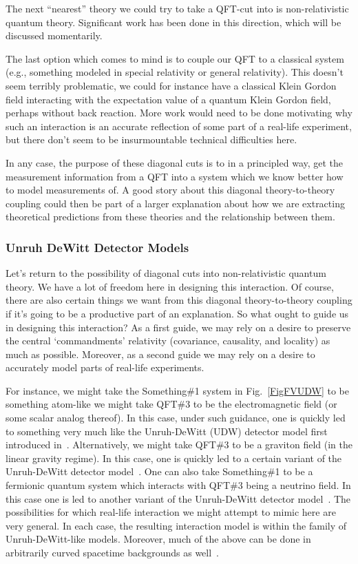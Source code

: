 \documentclass[12pt,prd,superscriptaddress,floatfix,amsmath,amssymb,amsfonts,nofootinbib]{revtex4-2}
\begin{document}
The next ``nearest'' theory we could try to take a QFT-cut into is non-relativistic quantum theory. Significant work has been done in this direction, which will be discussed momentarily.

The last option which comes to mind is to couple our QFT to a classical system (e.g., something modeled in special relativity or general relativity). This doesn't seem terribly problematic, we could for instance have a classical Klein Gordon field interacting with the expectation value of a quantum Klein Gordon field, perhaps without back reaction. More work would need to be done motivating why such an interaction is an accurate reflection of some part of a real-life experiment, but there don't seem to be insurmountable technical difficulties here.

In any case, the purpose of these diagonal cuts is to in a principled way, get the measurement information from a QFT into a system which we know better how to model measurements of. A good story about this diagonal theory-to-theory coupling could then be part of a larger explanation about how we are extracting theoretical predictions from these theories and the relationship between them. 

\subsubsection*{Unruh DeWitt Detector Models}
Let's return to the possibility of diagonal cuts into non-relativistic quantum theory. We have a lot of freedom here in designing this interaction. Of course, there are also certain things we want from this diagonal theory-to-theory coupling if it's going to be a productive part of an explanation. So what ought to guide us in designing this interaction? As a first guide, we may rely on a desire to preserve the central `commandments' relativity (covariance, causality, and locality) as much as possible. Moreover, as a second guide we may rely on a desire to accurately model parts of real-life experiments. 

For instance, we might take the Something\#1 system in Fig.~\ref{FigFVUDW} to be something atom-like we might take QFT\#3 to be the electromagnetic field (or some scalar analog thereof). In this case, under such guidance, one is quickly led~\cite{Pablo,RichardEdu,Richard} to something very much like the Unruh-DeWitt (UDW) detector model first introduced in~\cite{Unruh1976}.  Alternatively, we might take QFT\#3 to be a graviton field (in the linear gravity regime). In this case, one is quickly led to a certain variant of the Unruh-DeWitt detector model~\cite{GRQO,GravityDetector,GravityDetector2}. One can also take Something\#1 to be a fermionic quantum system which interacts with QFT\#3 being a neutrino field. In this case one is led to another variant of the Unruh-DeWitt detector model~\cite{MatsasNeutrinos, perche2021antiparticle}. The possibilities for which real-life interaction we might attempt to mimic here are very general. In each case, the resulting interaction model is within the family of Unruh-DeWitt-like models. Moreover, much of the above can be done in arbitrarily curved spacetime backgrounds as well~\cite{GRQO}.
\end{document}
